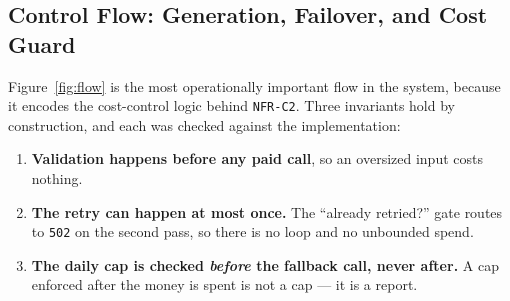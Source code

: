 \documentclass[11pt,a4paper]{article}
\newcommand{\reqid}[1]{\texttt{#1}}
\begin{document}
\subsection{Control Flow: Generation, Failover, and Cost Guard}
Figure~\ref{fig:flow} is the most operationally important flow in the
system, because it encodes the cost-control logic behind \reqid{NFR-C2}.
Three invariants hold by construction, and each was checked against the
implementation:
\begin{enumerate}[nosep]
    \item \textbf{Validation happens before any paid call}, so an oversized
        input costs nothing.
    \item \textbf{The retry can happen at most once.} The ``already
        retried?'' gate routes to \texttt{502} on the second pass, so there
        is no loop and no unbounded spend.
    \item \textbf{The daily cap is checked \emph{before} the fallback call,
        never after.} A cap enforced after the money is spent is not a cap
        --- it is a report.
\end{enumerate}
\end{document}
